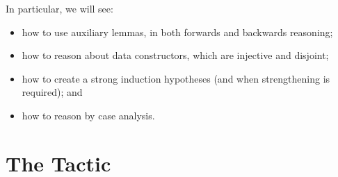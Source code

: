 \documentclass[12pt]{report}
\begin{document}
    In particular, we will see:



\begin{itemize}
\item  how to use auxiliary lemmas, in both forwards and backwards reasoning;

\item  how to reason about data constructors, which are injective and disjoint;

\item  how to create a strong induction hypotheses (and when
      strengthening is required); and

\item  how to reason by case analysis.

\end{itemize}
 \begin{coqdoccode}
\coqdocemptyline
\end{coqdoccode}
\section{The \texorpdfstring{\protect{}}{apply} Tactic}
\end{document}

